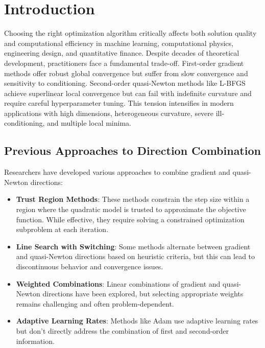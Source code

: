 \hypertarget{introduction}{%
\section{Introduction}\label{introduction}}

Choosing the right optimization algorithm critically affects both solution quality and computational efficiency in machine learning, computational physics, engineering design, and quantitative finance.
Despite decades of theoretical development, practitioners face a fundamental trade-off.
First-order gradient methods offer robust global convergence but suffer from slow convergence and sensitivity to conditioning.
Second-order quasi-Newton methods like L-BFGS achieve superlinear local convergence but can fail with indefinite curvature and require careful hyperparameter tuning.
This tension intensifies in modern applications with high dimensions, heterogeneous curvature, severe ill-conditioning, and multiple local minima.

\hypertarget{previous-approaches-to-direction-combination}{%
\subsection{Previous Approaches to Direction Combination}\label{previous-approaches-to-direction-combination}}

Researchers have developed various approaches to combine gradient and quasi-Newton directions:

\begin{itemize}
\item
  \textbf{Trust Region Methods}: These methods constrain the step size within a region where the quadratic model is trusted to approximate the objective function. While effective, they require solving a constrained optimization subproblem at each iteration.
\item
  \textbf{Line Search with Switching}: Some methods alternate between gradient and quasi-Newton directions based on heuristic criteria, but this can lead to discontinuous behavior and convergence issues.
\item
  \textbf{Weighted Combinations}: Linear combinations of gradient and quasi-Newton directions have been explored, but selecting appropriate weights remains challenging and often problem-dependent.
\item
  \textbf{Adaptive Learning Rates}: Methods like Adam use adaptive learning rates but don't directly address the combination of first and second-order information.
\end{itemize}

